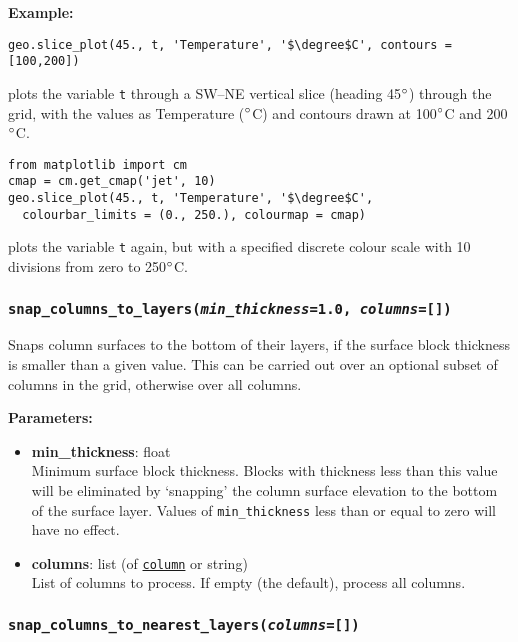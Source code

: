 \textbf{Example:}

\begin{lstlisting}
geo.slice_plot(45., t, 'Temperature', '$\degree$C', contours = [100,200])
\end{lstlisting}

plots the variable \texttt{t} through a SW--NE vertical slice (heading 45$\degree$) through the grid, with the values as Temperature ($\degree$C) and contours drawn at 100$\degree$C and 200$\degree$C.

\begin{lstlisting}
from matplotlib import cm
cmap = cm.get_cmap('jet', 10)
geo.slice_plot(45., t, 'Temperature', '$\degree$C',
  colourbar_limits = (0., 250.), colourmap = cmap)
\end{lstlisting}

plots the variable \texttt{t} again, but with a specified discrete colour scale with 10 divisions from zero to 250$\degree$C.

\begin{snugshade}\subsubsection{\texttt{snap\_columns\_to\_layers(\emph{min\_thickness}=1.0, \emph{columns}=[])}}\end{snugshade}
\label{sec:mulgrid:snap_columns_to_layers}

Snaps column surfaces to the bottom of their layers, if the surface block thickness is smaller than a given value.  This can be carried out over an optional subset of columns in the grid, otherwise over all columns.

\textbf{Parameters:}
\begin{itemize}
\item \textbf{min\_thickness}: float\\
  Minimum surface block thickness.  Blocks with thickness less than this value will be eliminated by `snapping' the column surface elevation to the bottom of the surface layer.  Values of \texttt{min\_thickness} less than or equal to zero will have no effect.
\item \textbf{columns}: list (of \hyperref[columnobjects]{\texttt{column}} or string)\\
  List of columns to process.  If empty (the default), process all columns.
\end{itemize}

\begin{snugshade}\subsubsection{\texttt{snap\_columns\_to\_nearest\_layers(\emph{columns}=[])}}\end{snugshade}
\label{sec:mulgrid:snap_columns_to_nearest_layers}

